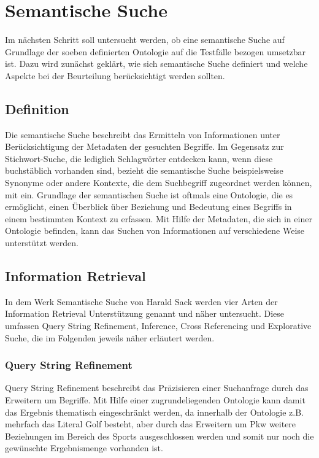 \chapter{Semantische Suche}
Im nächsten Schritt soll untersucht werden, ob eine semantische Suche auf Grundlage der soeben definierten Ontologie auf die Testfälle bezogen umsetzbar ist. Dazu wird zunächst geklärt, wie sich semantische Suche definiert und welche Aspekte bei der Beurteilung berücksichtigt werden sollten.

\section{Definition}
Die semantische Suche beschreibt das Ermitteln von Informationen unter Berücksichtigung der Metadaten der gesuchten Begriffe. Im Gegensatz zur Stichwort-Suche, die lediglich Schlagwörter entdecken kann, wenn diese buchstäblich vorhanden sind, bezieht die semantische Suche beispielsweise Synonyme oder andere Kontexte, die dem Suchbegriff zugeordnet werden können, mit ein.\newline
Grundlage der semantischen Suche ist oftmals eine Ontologie, die es ermöglicht, einen Überblick über Beziehung und Bedeutung eines Begriffs in einem bestimmten Kontext zu erfassen. Mit Hilfe der Metadaten, die sich in einer Ontologie befinden, kann das Suchen von Informationen auf verschiedene Weise unterstützt werden.
\cite[S.19]{Sack.2010}

\section{Information Retrieval}
In dem Werk \glqq Semantische Suche\grqq{} von Harald Sack\cite[S.19-22]{Sack.2010} werden vier Arten der Information Retrieval Unterstützung genannt und näher untersucht. Diese umfassen \glqq Query String Refinement\grqq{}, \glqq Inference\grqq{}, \glqq Cross Referencing\grqq{} und \glqq Explorative Suche\grqq{}, die im Folgenden jeweils näher erläutert werden.

\subsection*{Query String Refinement}
Query String Refinement beschreibt das Präzisieren einer Suchanfrage durch das Erweitern um Begriffe. Mit Hilfe einer zugrundeliegenden Ontologie kann damit das Ergebnis thematisch eingeschränkt werden, da innerhalb der Ontologie z.B. mehrfach das Literal \glqq Golf\grqq{} besteht, aber durch das Erweitern um \glqq Pkw\grqq{} weitere Beziehungen im Bereich des Sports ausgeschlossen werden und somit nur noch die gewünschte Ergebnismenge vorhanden ist.

